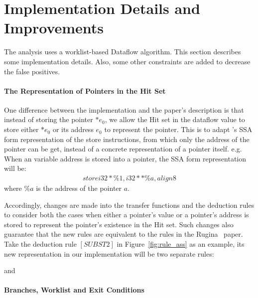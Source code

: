 \section{Implementation Details and Improvements}
\label{s:implementation}

The analysis uses a worklist-based Dataflow algorithm. 
This section describes some implementation details. Also, some other constraints 
are added to decrease the false positives.

\paragraph{The Representation of Pointers in the Hit Set}

One difference between the implementation and the paper's description is that 
instead of storing the pointer ${*e_0}$,
we allow the Hit set in the dataflow value to store either ${*e_0}$ or its 
address ${e_0}$ to represent the pointer. This is to adapt \llvm's SSA form 
representation of the store instructions, from which only the address of the 
pointer can be get, instead of a concrete representation of a pointer itself. 
e.g. When an variable address is stored into a pointer, the SSA form 
representation will be:
\begin{align*}
store i32* \%1, i32** \%a, align 8
\end{align*}
where $\%a$ is the address of the pointer $a$.

Accordingly, changes are made into the transfer functions and the deduction 
rules to consider both the cases when either a pointer's value or a pointer's 
address is stored to represent the pointer's existence in the Hit set. 
Such changes also guarantee that the new rules are equivalent to the rules in 
the Rugina~\cite{rugina} paper. Take the deduction rule $[SUBST2]$ in 
Figure~\ref{fig:rule_ass} 
as an example, its new representation in our implementation will 
be two separate rules:
\begin{prooftree}
\end{prooftree}
and
\begin{prooftree}
\end{prooftree}


\paragraph{Branches, Worklist and Exit Conditions}

